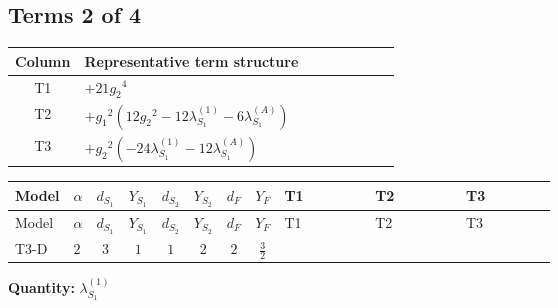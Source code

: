 \documentclass[8pt]{article}
\begin{document}
\begin{landscape}
\subsection*{Terms 2 of 4}
\begin{center}
\begin{tabular}{@{}c >{\raggedright\arraybackslash}p{0.82\linewidth}@{}}
\toprule
Column & Representative term structure \\
\midrule
T1 & \(\displaystyle +21 {g_2}^4\) \\
\midrule
T2 & \(\displaystyle +{g_1}^2 \left(12 {g_2}^2-12 {\lambda_{S_1}^{(1)}}-6 {\lambda_{S_1}^{(A)}}\right)\) \\
\midrule
T3 & \(\displaystyle +{g_2}^2 (-24 {\lambda_{S_1}^{(1)}}-12 {\lambda_{S_1}^{(A)}})\) \\
\midrule
\bottomrule
\end{tabular}
\end{center}
\smallskip
\tiny
\begin{longtable}{@{}llcccccc >{\raggedright\arraybackslash}p{0.21\linewidth} >{\raggedright\arraybackslash}p{0.21\linewidth} >{\raggedright\arraybackslash}p{0.21\linewidth}@{}}
\toprule
Model & $\alpha$ & $d_{S_1}$ & $Y_{S_1}$ & $d_{S_2}$ & $Y_{S_2}$ & $d_F$ & $Y_F$ & T1 & T2 & T3 \\
\midrule
\endfirsthead
\toprule
Model & $\alpha$ & $d_{S_1}$ & $Y_{S_1}$ & $d_{S_2}$ & $Y_{S_2}$ & $d_F$ & $Y_F$ & T1 & T2 & T3 \\
\midrule
\endhead
T3-D & $2$ & $3$ & $1$ & $1$ & $2$ & $2$ & $\frac{3}{2}$ & \scriptsize\adjustbox{max width=\linewidth}{$\begin{gathered} +21 {g_2}^4\end{gathered}$} & \scriptsize\adjustbox{max width=\linewidth}{$\begin{gathered} +{g_1}^2 \left(12 {g_2}^2-12 {\lambda_{S_1}^{(1)}}-6 {\lambda_{S_1}^{(A)}}\right)\end{gathered}$} & \scriptsize\adjustbox{max width=\linewidth}{$\begin{gathered} +{g_2}^2 (-24 {\lambda_{S_1}^{(1)}}-12 {\lambda_{S_1}^{(A)}})\end{gathered}$} \\
\midrule
\bottomrule
\end{longtable}
\clearpage
\noindent\textbf{Quantity: }$\lambda_{S_1}^{(1)}$\par\smallskip

\end{landscape}
\end{document}
